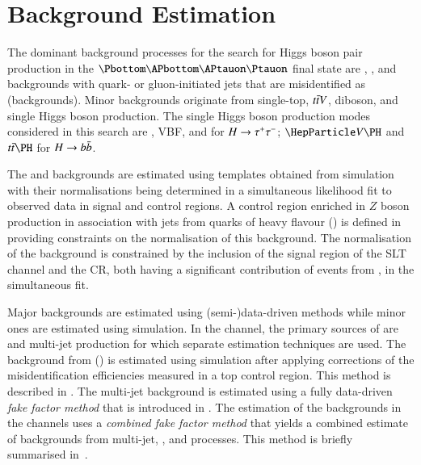 \section{Background Estimation}%
\label{sec:background_estimation}

The dominant background processes for the search for Higgs boson pair
production in the $\bbtautau$ final state are \Zjets, \ttbar, and
backgrounds with quark- or gluon-initiated jets that are misidentified
as \tauhadvis (\faketauhadvis backgrounds).
Minor backgrounds originate from single-top, $t\bar{t} V$,
diboson, and single Higgs boson production.  The single Higgs boson
production modes considered in this search are \ggF, VBF, \VH and \ttH
for $H \to \tau^{+} \tau^{-}$; $\VH$ and $\ttH$ for $H \to b\bar{b}$.

The \Zjets and \ttbar backgrounds are estimated using templates
obtained from simulation with their normalisations being determined in
a simultaneous likelihood fit to observed data in signal and control
regions. A control region enriched in $Z$ boson production in
association with jets from quarks of heavy flavour (\ZHF) is defined
in  providing constraints on the normalisation of
this background. The normalisation of the \ttbar background is
constrained by the inclusion of the signal region of the \lephad SLT
channel and the \ZHF CR, both having a significant contribution of
events from \ttbar, in the simultaneous fit.

Major \faketauhadvis backgrounds are estimated using
(semi-)data-driven methods while minor ones are estimated using
simulation. In the \hadhad channel, the primary sources of
\faketauhadvis are \ttbar and multi-jet production for which separate
estimation techniques are used. The \faketauhadvis background from
\ttbar (\ttbarFakes) is estimated using simulation after applying
corrections of the \jettotauhadvis misidentification efficiencies
measured in a top control region. This method is described in
.  The multi-jet background is
estimated using a fully data-driven \emph{fake factor method} that is
introduced in . The estimation of the
\faketauhadvis backgrounds in the \lephad channels uses a
\emph{combined fake factor method} that yields a combined estimate of
\faketauhadvis backgrounds from multi-jet, \Wjets, and \ttbar
processes. This method is briefly summarised
in~.

